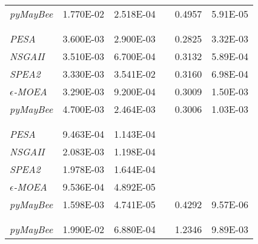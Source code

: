 \begin{table}
\begin{tabular}{L{4cm} c c c c c}
  \textit{pyMayBee}        & \num{1.770E-02} &  \num{2.518E-04} & & \num{0.4957} &  \num{5.91E-05} \\
  \\
  \addlinespace[\defaultaddspace]
                                                                                \\
  \midrule
  \textit{PESA}            & \num{3.600E-03} & \num{2.900E-03} & & \num{0.2825} & \num{3.32E-03} \\
  \textit{NSGAII}          & \num{3.510E-03} &  \num{6.700E-04} & & \num{0.3132} & \num{5.89E-04} \\
  \textit{SPEA2}           & \num{3.330E-03} & \num{3.541E-02} & &  \num{0.3160} &  \num{6.98E-04} \\
  \textit{$\epsilon$-MOEA} &  \num{3.290E-03} & \num{9.200E-04} & & \num{0.3009} & \num{1.50E-03} \\
  \textit{pyMayBee}        & \num{4.700E-03} & \num{2.464E-03} & & \num{0.3006} & \num{1.03E-03} \\
  \\
  \addlinespace[\defaultaddspace]
                                                                            \\
  \midrule
  \textit{PESA}            & \num{9.463E-04} & \num{1.143E-04} & & &                \\
  \textit{NSGAII}          & \num{2.083E-03} & \num{1.198E-04} & & &                \\
  \textit{SPEA2}           & \num{1.978E-03} & \num{1.644E-04} & & &                \\
  \textit{$\epsilon$-MOEA} &  \num{9.536E-04} & \num{4.892E-05} & & &                \\
  \textit{pyMayBee}        & \num{1.598E-03} &  \num{4.741E-05} & & \num{0.4292} & \num{9.57E-06}  \\
  \\
  \addlinespace[\defaultaddspace]
                                                                         \\
  \midrule
  \textit{pyMayBee}        & \num{1.990E-02} & \num{6.880E-04} & & \num{1.2346} & \num{9.89E-03} \\
  \bottomrule
  \end{tabular}
\end{table}

